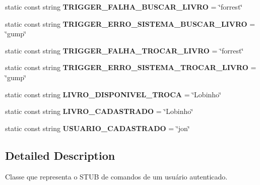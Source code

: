 \begin{DoxyCompactItemize}
\mbox{\label{classSTUBComandosusuarioautenticado_a55a441d1b1a4c579d028f23eb9fe6611}} 
static const string {\bfseries T\+R\+I\+G\+G\+E\+R\+\_\+\+F\+A\+L\+H\+A\+\_\+\+B\+U\+S\+C\+A\+R\+\_\+\+L\+I\+V\+RO} = \char`\"{}forrest\char`\"{}
\item 
\mbox{\label{classSTUBComandosusuarioautenticado_a29ead874532d57f9f1b86f8c287f813a}} 
static const string {\bfseries T\+R\+I\+G\+G\+E\+R\+\_\+\+E\+R\+R\+O\+\_\+\+S\+I\+S\+T\+E\+M\+A\+\_\+\+B\+U\+S\+C\+A\+R\+\_\+\+L\+I\+V\+RO} = \char`\"{}gump\char`\"{}
\item 
\mbox{\label{classSTUBComandosusuarioautenticado_a6af222cd1eff0bac96ab7194d496c903}} 
static const string {\bfseries T\+R\+I\+G\+G\+E\+R\+\_\+\+F\+A\+L\+H\+A\+\_\+\+T\+R\+O\+C\+A\+R\+\_\+\+L\+I\+V\+RO} = \char`\"{}forrest\char`\"{}
\item 
\mbox{\label{classSTUBComandosusuarioautenticado_ada4a785006c657fb829db2b2f764af4d}} 
static const string {\bfseries T\+R\+I\+G\+G\+E\+R\+\_\+\+E\+R\+R\+O\+\_\+\+S\+I\+S\+T\+E\+M\+A\+\_\+\+T\+R\+O\+C\+A\+R\+\_\+\+L\+I\+V\+RO} = \char`\"{}gump\char`\"{}
\item 
\mbox{\label{classSTUBComandosusuarioautenticado_a5488361abe4431ae3f37b57f45d11f1f}} 
static const string {\bfseries L\+I\+V\+R\+O\+\_\+\+D\+I\+S\+P\+O\+N\+I\+V\+E\+L\+\_\+\+T\+R\+O\+CA} = \char`\"{}Lobinho\char`\"{}
\item 
\mbox{\label{classSTUBComandosusuarioautenticado_a6f5b109074186321b63b1bbb55be8b88}} 
static const string {\bfseries L\+I\+V\+R\+O\+\_\+\+C\+A\+D\+A\+S\+T\+R\+A\+DO} = \char`\"{}Lobinho\char`\"{}
\item 
\mbox{\label{classSTUBComandosusuarioautenticado_a3fae6f1d9ef8d902f72f6bcd9044a3c3}} 
static const string {\bfseries U\+S\+U\+A\+R\+I\+O\+\_\+\+C\+A\+D\+A\+S\+T\+R\+A\+DO} = \char`\"{}jon\char`\"{}
\end{DoxyCompactItemize}


\subsection{Detailed Description}
Classe que representa o S\+T\+UB de comandos de um usuário autenticado. 

